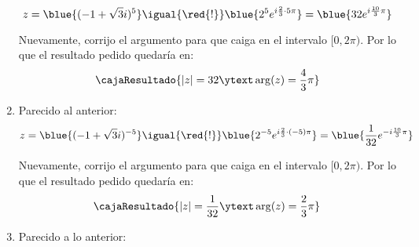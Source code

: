 \begin{enumerate}[label=\roman*)]
        \begin{minipage}{0.2\textwidth}
        \end{minipage}
        \begin{minipage}{0.7\textwidth}
          $$
            z = \blue{(-1 + \sqrt{3}i)^5}
            \igual{\red{!}}
            \blue{2^5 e^{i \frac{2}{3} \cdot 5\pi}}
            =
            \blue{32 e^{i \frac{10}{3} \pi}}
          $$
        \end{minipage}

        Nuevamente, corrijo el argumento para que caiga en el intervalo $[0, 2\pi)$.
        Por lo que el resultado pedido quedaría en:
        $$
          \cajaResultado{
            |z| = 32
            \ytext
            \arg(z) = \frac{4}{3} \pi
          }
        $$

  \item Parecido al anterior:
        $$
          z = \blue{(-1 + \sqrt{3}i)^{-5}}
          \igual{\red{!}}
          \blue{2^{-5} e^{i \frac{2}{3} \cdot (-5)\pi}}
          =
          \blue{\frac{1}{32} e^{-i \frac{10}{3} \pi}}
        $$

        Nuevamente, corrijo el argumento para que caiga en el intervalo $[0, 2\pi)$.
        Por lo que el resultado pedido quedaría en:
        $$
          \cajaResultado{
            |z| = \frac{1}{32}
            \ytext
            \arg(z) = \frac{2}{3} \pi
          }
        $$

  \item Parecido a lo anterior:

        \begin{minipage}{0.2\textwidth}
\end{minipage}
\end{enumerate}
